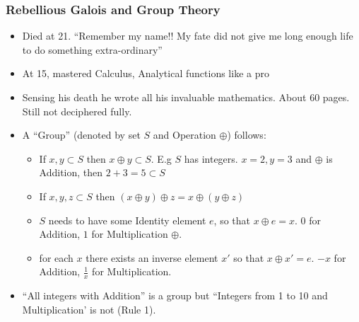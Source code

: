 \begin{frame}[fragile]
\frametitle{Rebellious Galois and Group Theory}
\begin{itemize}
\item Died at 21. ``Remember my name!! My fate did not give me long enough life to do something extra-ordinary''
\item At 15, mastered Calculus, Analytical functions like a pro
\item Sensing his death he wrote all his invaluable mathematics. About 60 pages. Still not deciphered fully.
\item A ``Group'' (denoted by set $S$ and Operation $\oplus$) follows:
	\begin{itemize}
	\item If $x,y \subset S$ then $ x \oplus y \subset S$. E.g $S$ has integers. $x=2,y=3$ and $\oplus$ is Addition, then $2+3=5 \subset S$
	\item If $x,y,z \subset S$ then $( x \oplus y) \oplus z = x \oplus (y \oplus z)$
	\item $S$ needs to have some Identity element $e$, so that $ x \oplus e = x$. $0$ for Addition, $1$ for Multiplication $\oplus$.
	\item for each $x$ there exists an inverse element $x'$ so that $x \oplus x' = e$. $-x$ for Addition, $\frac{1}{x}$ for Multiplication.
	\end{itemize}
\item ``All integers with Addition'' is a group but ``Integers from 1 to 10 and Multiplication' is not (Rule 1).
\end{itemize}
\end{frame}



